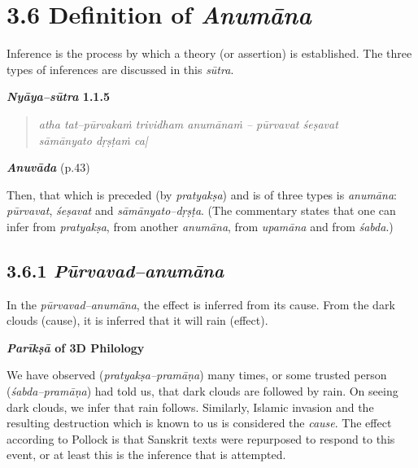 \vspace{-.3cm}

\section*{3.6 Definition of {\it {\bfseries Anumāna}}}

\vspace{-.2cm}

Inference is the process by which a theory (or assertion) is established. The three types of inferences are discussed in this \textit{sūtra}.

\textbf{\textit{Nyāya–sūtra} 1.1.5}

\vspace{-.3cm}

\begin{verse}
\textit{atha tat–pūrvakaṁ trividham anumānaṁ – pūrvavat śeṣavat\\ sāmānyato dṛṣṭaṁ ca|}
\end{verse}

\textit{\textbf{Anuvāda}} (p.43)

Then, that which is preceded (by \textit{pratyakṣa}) and is of three types is\textit{ anumāna}: \textit{pūrvavat}, \textit{śeṣavat} and \textit{sāmānyato–dṛṣṭa}. (The commentary states that one can infer from \textit{pratyakṣa}, from another \textit{anumāna}, from \textit{upamāna} and from \textit{śabda}.)

\vspace{-.3cm}

\subsection*{3.6.1 {\it {\bfseries Pūrvavad–anumāna}}}

\vspace{-.2cm}

In the \textit{pūrvavad–anumāna}, the effect is inferred from its cause. From the dark clouds (cause), it is inferred that it will rain (effect).

\textbf{\textit{Parīkṣā} of 3D Philology}

We have observed (\textit{pratyakṣa–pramāṇa}) many times, or some trusted person (\textit{śabda–pramāṇa}) had told us, that dark clouds are followed by rain. On seeing dark clouds, we infer that rain follows. Similarly, Islamic invasion and the resulting destruction which is known to us is considered the \textit{cause}. The effect according to Pollock is that Sanskrit texts were repurposed to respond to this event, or at least this is the inference that is attempted.

